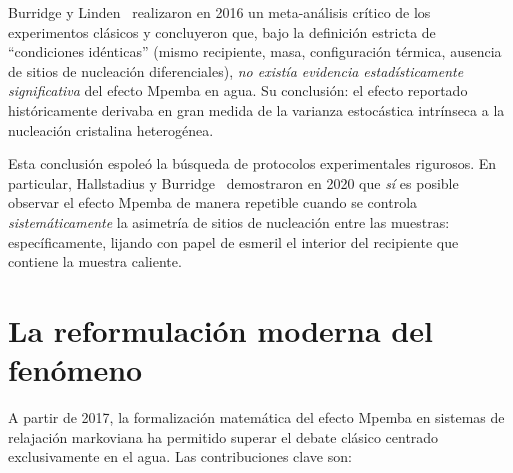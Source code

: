 Burridge y Linden~\cite{burridge2016} realizaron en 2016 un meta-análisis crítico de 
los experimentos clásicos y concluyeron que, bajo la definición estricta de 
``condiciones idénticas'' (mismo recipiente, masa, configuración térmica, ausencia 
de sitios de nucleación diferenciales), \emph{no existía evidencia estadísticamente 
significativa} del efecto Mpemba en agua. Su conclusión: el efecto reportado 
históricamente derivaba en gran medida de la varianza estocástica intrínseca a la 
nucleación cristalina heterogénea.

Esta conclusión espoleó la búsqueda de protocolos experimentales rigurosos. En 
particular, Hallstadius y Burridge~\cite{hallstadius2020} demostraron en 2020 que 
\emph{sí} es posible observar el efecto Mpemba de manera repetible cuando se 
controla \emph{sistemáticamente} la asimetría de sitios de nucleación entre las 
muestras: específicamente, lijando con papel de esmeril el interior del recipiente 
que contiene la muestra caliente.

\section{La reformulación moderna del fenómeno}

A partir de 2017, la formalización matemática del efecto Mpemba en sistemas de 
relajación markoviana ha permitido superar el debate clásico centrado exclusivamente 
en el agua. Las contribuciones clave son:

